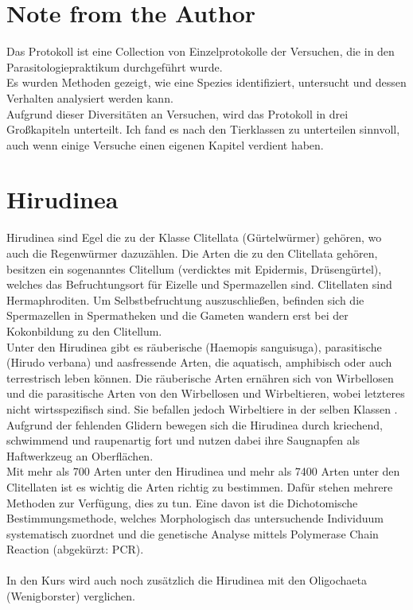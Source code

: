 \documentclass[oneside,10pt,a4paper]{report}
\begin{document}
	
	\tableofcontents
	\chapter{Note from the Author}
	Das Protokoll ist eine Collection von Einzelprotokolle der Versuchen, die in den Parasitologiepraktikum durchgeführt wurde.\\
	Es wurden Methoden gezeigt, wie eine Spezies identifiziert, untersucht und dessen Verhalten analysiert werden kann.\\
	Aufgrund dieser Diversitäten an Versuchen, wird das Protokoll in drei Großkapiteln unterteilt. Ich fand es nach den Tierklassen zu unterteilen sinnvoll, auch wenn einige Versuche einen eigenen Kapitel verdient haben.
	
	
	\chapter{Hirudinea}	
	Hirudinea sind Egel die zu der Klasse Clitellata (Gürtelwürmer) gehören, wo auch die Regenwürmer dazuzählen. Die Arten die zu den Clitellata gehören, besitzen ein sogenanntes Clitellum (verdicktes mit Epidermis, Drüsengürtel), welches das Befruchtungsort für Eizelle und Spermazellen sind. Clitellaten sind Hermaphroditen. Um Selbstbefruchtung auszuschließen, befinden sich die Spermazellen in Spermatheken und die Gameten wandern erst bei der Kokonbildung zu den Clitellum.\\
	Unter den Hirudinea gibt es räuberische (Haemopis sanguisuga), parasitische (Hirudo verbana) und aasfressende Arten, die aquatisch, amphibisch oder auch terrestrisch leben können.
	Die räuberische Arten ernähren sich von Wirbellosen und die parasitische Arten von den Wirbellosen und Wirbeltieren, wobei letzteres nicht wirtsspezifisch sind. Sie befallen jedoch Wirbeltiere in der selben Klassen \cite{Kühkental}.
	Aufgrund der fehlenden Glidern bewegen sich die Hirudinea durch kriechend, schwimmend und raupenartig fort und nutzen dabei ihre Saugnapfen als Haftwerkzeug an Oberflächen.\\
	Mit mehr als 700 Arten unter den Hirudinea und mehr als 7400 Arten unter den Clitellaten ist es wichtig die Arten richtig zu bestimmen.  Dafür stehen mehrere Methoden zur Verfügung, dies zu tun. Eine davon ist die Dichotomische Bestimmungsmethode, welches Morphologisch das untersuchende Individuum systematisch zuordnet und die genetische Analyse mittels Polymerase Chain Reaction (abgekürzt: PCR).\\
	\\
	In den Kurs wird auch noch zusätzlich die Hirudinea mit den Oligochaeta (Wenigborster) verglichen.
	
\end{document}
